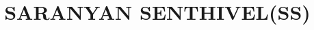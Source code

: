 \ifnum{}
\newcommand{\HeaderText}{}
\newcommand{\FooterText}{\UseHeaderFooterFont\hfill%
{Page}~{\thepage}~of~\pageref{LastPage}%
\hfill}
\else
\newcommand{\HeaderText}{}
\newcommand{\FooterText}{\UseHeaderFooterFont%
\hphantom{DRAFT~\Timestamp}\hfill%
{Page}~{\thepage}~of~\pageref{LastPage}%
\hfill{\color{red}DRAFT~\Timestamp}}
\fi

\makeatletter
\def\ps@plain{%
\def\@oddhead{\HeaderText}%
\def\@evenhead{\HeaderText}%
\def\@oddfoot{\FooterText}%
\def\@evenfoot{\FooterText}}
\makeatother

\pagestyle{plain}

\setlength{\parindent}{0in} %
\setlength{\parskip}{0in} %

\newcommand{\hide}[1]{}

\newcommand{\CVAuthor}{Saranyan Senthivel}
\newcommand{\CVTitle}{Saranyan Senthivel's CV}
\newcommand{\CVNote}{Saranyan Senthivel}
\newcommand{\CVWebpage}{}

\newcommand{\CodeCommand}[1]{\mbox{\textbf{\textbackslash{#1}}}}

\title{\vspace{-5ex}\MakeUppercase{\textbf{Saranyan Senthivel(SS)}}}
\date{\vspace{-10ex}}


